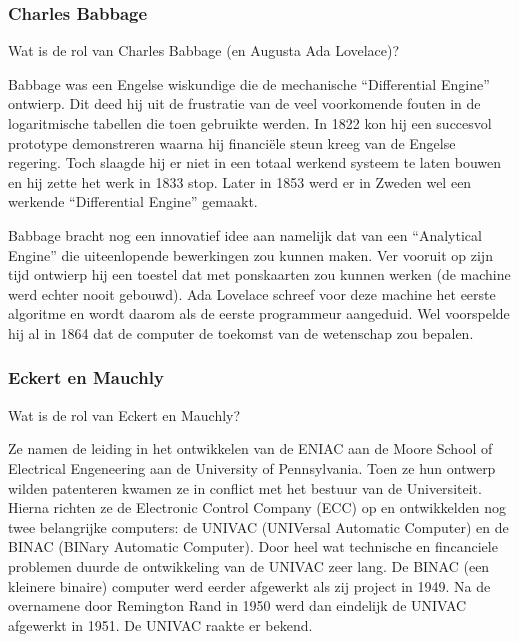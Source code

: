 \documentclass[../main.tex]{subfiles}
\begin{document}
\subsubsection{Charles Babbage}
\begin{question}
Wat is de rol van Charles Babbage (en Augusta Ada Lovelace)?
\end{question}
\begin{solution}
Babbage was een Engelse wiskundige die de mechanische ``Differential Engine'' ontwierp.
Dit deed hij uit de frustratie van de veel voorkomende fouten in de logaritmische tabellen die toen gebruikte werden.
In 1822 kon hij een succesvol prototype demonstreren waarna hij financi\"ele steun kreeg van de Engelse regering.
Toch slaagde hij er niet in een totaal werkend systeem te laten bouwen en hij zette het werk in 1833 stop.
Later in 1853 werd er in Zweden wel een werkende ``Differential Engine'' gemaakt.

Babbage bracht nog een innovatief idee aan namelijk dat van een ``Analytical Engine'' die uiteenlopende bewerkingen zou kunnen maken.
Ver vooruit op zijn tijd ontwierp hij een toestel dat met ponskaarten zou kunnen werken (de machine werd echter nooit gebouwd).
Ada Lovelace schreef voor deze machine het eerste algoritme en wordt daarom als de eerste programmeur aangeduid.
Wel voorspelde hij al in 1864 dat de computer de toekomst van de wetenschap zou bepalen.
\end{solution}

\subsubsection{Eckert en Mauchly}
\begin{question}
Wat is de rol van Eckert en Mauchly?
\end{question}
\begin{solution}
Ze namen de leiding in het ontwikkelen van de ENIAC aan de Moore School of Electrical Engeneering aan de University of Pennsylvania.
Toen ze hun ontwerp wilden patenteren kwamen ze in conflict met het bestuur van de Universiteit.
Hierna richten ze de Electronic Control Company (ECC) op en ontwikkelden nog twee belangrijke computers: de UNIVAC (UNIVersal Automatic Computer) en de BINAC (BINary Automatic Computer).
Door heel wat technische en fincanciele problemen duurde de ontwikkeling van de UNIVAC zeer lang.
De BINAC (een kleinere binaire) computer werd eerder afgewerkt als zij project in 1949.
Na de overnamene door Remington Rand in 1950 werd dan eindelijk de UNIVAC afgewerkt in 1951.
De UNIVAC raakte er bekend.
\end{solution}
\end{document}
